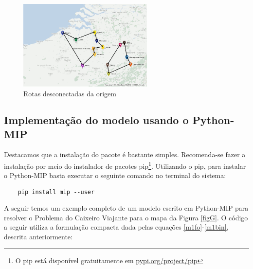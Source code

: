 \documentclass[a4paper,11pt,fleqn]{article}
\begin{document}
\begin{figure}[h!]
	\begin{centering}
		\includegraphics[width=0.6\textwidth]{belgium-tourism-14-subtour.png}
		\par\end{centering}
	\caption{Rotas desconectadas da origem}
	\label{figSub}
\end{figure}

\subsection{Implementação do modelo usando o Python-MIP}

Destacamos que a instalação do pacote é bastante simples. 
Recomenda-se fazer a instalação por meio do instalador de pacotes pip\footnote{O pip está disponível gratuitamente em \url{pypi.org/project/pip}}.
Utilizando o pip, para instalar o Python-MIP basta executar o seguinte comando no terminal do sistema:

\begin{verbatim}
    pip install mip --user
\end{verbatim}

A seguir temos um exemplo completo de um modelo escrito em Python-MIP para resolver o Problema do Caixeiro Viajante para o mapa da Figura \ref{figG}.
O código a seguir utiliza a formulação compacta dada pelas equações \eqref{m1fo}-\eqref{m1bin}, descrita anteriormente:
\end{document}
